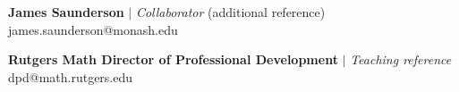 \resumeProjectHeading
{\textbf{James Saunderson} $|$ \textit{Collaborator} (additional reference)}  
{james.saunderson@monash.edu}
{\resumeItemListStart
{}
\resumeItemListEnd}
\vspace{\gap}

\resumeProjectHeading
{\textbf{Rutgers Math Director of Professional Development} $|$ \textit{Teaching reference}}
{dpd@math.rutgers.edu}
{\resumeItemListStart
{}
\resumeItemListEnd}
\vspace{\gap}








\resumeSubHeadingListEnd








